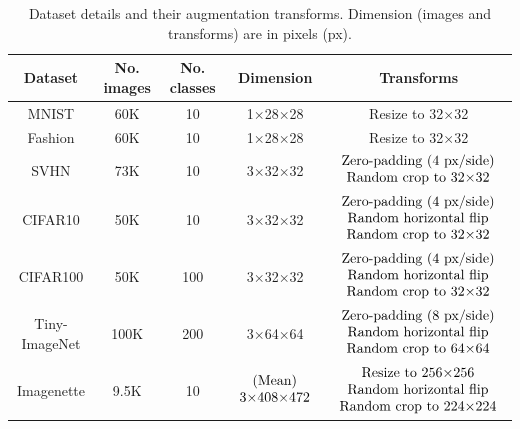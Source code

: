 \begin{table}[ht]
    \caption{Dataset details and their augmentation transforms. Dimension (images and transforms) are in pixels (px).}
    \label{ch3:tab:Dataset-details}
    \centering
    \begin{tabular}{c|c|c|c|c}
        \hline
        \textbf{Dataset} & \textbf{No. images} & \textbf{No. classes} & \textbf{Dimension} & \textbf{Transforms}\tabularnewline \hline
        \hline
        MNIST & 60K & 10 & 1$\times$28$\times$28 & Resize to 32$\times$32\tabularnewline \hline
        Fashion & 60K & 10 & 1$\times$28$\times$28 & Resize to 32$\times$32\tabularnewline \hline
        SVHN & 73K & 10 & 3$\times$32$\times$32 & $\begin{array}{c}\text{Zero-padding (4 px/side)}\\\text{Random crop to 32\ensuremath{\times}32}\end{array}$\tabularnewline \hline
        CIFAR10 & 50K & 10 & 3$\times$32$\times$32 & $\begin{array}{c}\text{Zero-padding (4 px/side)}\\\text{Random horizontal flip}\\\text{Random crop to 32\ensuremath{\times}32}\end{array}$\tabularnewline \hline
        CIFAR100 & 50K & 100 & 3$\times$32$\times$32 & $\begin{array}{c} \text{Zero-padding (4 px/side)}\\ \text{Random horizontal flip}\\ \text{Random crop to 32\ensuremath{\times}32} \end{array}$\tabularnewline \hline
        Tiny-ImageNet & 100K & 200 & 3$\times$64$\times$64 & $\begin{array}{c} \text{Zero-padding (8 px/side)}\\ \text{Random horizontal flip}\\ \text{Random crop to 64\ensuremath{\times}64} \end{array}$\tabularnewline \hline
        Imagenette & 9.5K & 10 & $\begin{array}{c} \text{(Mean)}\\ \text{3\ensuremath{\times}408\ensuremath{\times}472} \end{array}$  & $\begin{array}{c}\text{Resize to 256\ensuremath{\times}256}\\\text{Random horizontal flip}\\\text{Random crop to 224\ensuremath{\times}224}\end{array}$\tabularnewline \hline
    \end{tabular}
\end{table}



